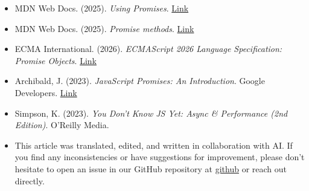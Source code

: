 \documentclass[12pt,letterpaper]{article}
\begin{document}
\begin{itemize}
    \item MDN Web Docs. (2025). \textit{Using Promises}. \href{https://developer.mozilla.org/en-US/docs/Web/JavaScript/Guide/Using_promises}{Link}
    
    \item MDN Web Docs. (2025). \textit{Promise methods}. \href{https://developer.mozilla.org/en-US/docs/Web/JavaScript/Reference/Global_Objects/Promise#Static_methods}{Link}
    
    \item ECMA International. (2026). \textit{ECMAScript 2026 Language Specification: Promise Objects}. \href{https://tc39.es/ecma262/multipage/control-abstraction-objects.html#sec-promise-objects}{Link}
    
    \item Archibald, J. (2023). \textit{JavaScript Promises: An Introduction}. Google Developers. \href{https://web.dev/articles/promises}{Link}
    
    \item Simpson, K. (2023). \textit{You Don't Know JS Yet: Async \& Performance (2nd Edition)}. O'Reilly Media.

    \item This article was translated, edited, and written in collaboration with AI. If you find any inconsistencies or have suggestions for improvement, please don't hesitate to open an issue in our GitHub repository at \href{https://github.com/asanchezyali/social-media-posts}{github} or reach out directly.
\end{itemize}
\end{document}
